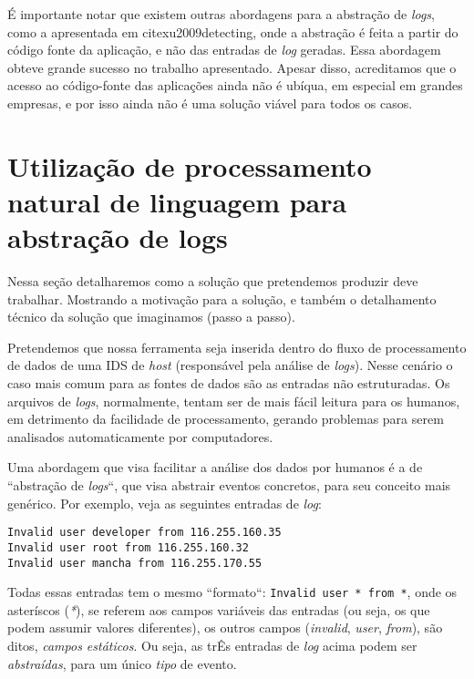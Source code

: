 \documentclass[
	12pt,				%
	openright,			%
	twoside,			%
	a4paper,			%
	english,			%
	spanish,			%
	brazil,				%
	]{abntex2}
\begin{document}
É importante notar que existem outras abordagens para a abstração de \emph{logs}, como a apresentada em cite{xu2009detecting}, onde a abstração é feita a partir do código fonte da aplicação, e não das entradas de \emph{log} geradas. Essa abordagem obteve grande sucesso no trabalho apresentado. Apesar disso, acreditamos que o acesso ao código-fonte das aplicações ainda não é ubíqua, em especial em grandes empresas, e por isso ainda não é uma solução viável para todos os casos. 


\chapter{Utilização de processamento natural de linguagem para abstração de logs}\label{chap:proposta}

Nessa seção detalharemos como a solução que pretendemos produzir deve trabalhar. Mostrando a motivação para a solução, e também o detalhamento técnico da solução que imaginamos (passo a passo).

Pretendemos que nossa ferramenta seja inserida dentro do fluxo de processamento de dados de uma IDS de \emph{host} (responsável pela análise de \emph{logs}). Nesse cenário o caso mais comum para as fontes de dados são as entradas não estruturadas. Os arquivos de \emph{logs}, normalmente, tentam ser de mais fácil leitura para os humanos, em detrimento da facilidade de processamento, gerando problemas para serem analisados automaticamente por computadores. 

Uma abordagem que visa facilitar a análise dos dados por humanos é a de ``abstração de \emph{logs}``, que visa abstrair eventos concretos, para seu conceito mais genérico. Por exemplo, veja as seguintes entradas de \emph{log}:

\begin{verbatim}
Invalid user developer from 116.255.160.35
Invalid user root from 116.255.160.32
Invalid user mancha from 116.255.170.55
\end{verbatim}
	
Todas essas entradas tem o mesmo ``formato``: \verb|Invalid user * from *|, onde os asteríscos (\emph{*}), se referem aos campos variáveis das entradas (ou seja, os que podem assumir valores diferentes), os outros campos (\emph{invalid}, \emph{user}, \emph{from}), são ditos, \emph{campos estáticos}. Ou seja, as trÊs entradas de \emph{log} acima podem ser \emph{abstraídas}, para um único \emph{tipo} de evento. 
\end{document}
